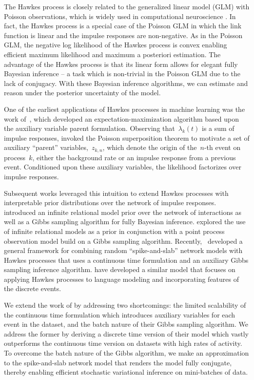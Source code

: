 The Hawkes process is closely related to the generalized linear model (GLM) with Poisson observations, which is widely used in computational neuroscience \cite{Paninski-2004, Pillow-2008}.  
In fact, the Hawkes process is a special case of the Poisson GLM in which the link function is linear and the impulse responses are non-negative. 
As in the Poisson GLM, the negative log likelihood of the Hawkes process is convex enabling efficient maximum likelihood and maximum a posteriori estimation. 
The advantage of the Hawkes process is that its linear form allows for elegant fully Bayesian inference -- a task which is non-trivial  in the Poisson GLM due to the lack of conjugacy. With these Bayesian inference algorithms, we can estimate and reason under the posterior uncertainty of the model.

One of the earliest applications of Hawkes processes in machine learning was the work of~\citet{Simma-2010}, which developed an expectation-maximization algorithm based upon the auxiliary variable parent formulation. Observing that~$\lambda_{k}(t)$ is a sum of impulse responses, \citet{Simma-2010} invoked the Poisson superposition theorem to motivate a set of auxiliary ``parent'' variables,~$z_{k,n}$, which denote the origin of the~$n$-th event on process~$k$, either the background rate or an impulse response from a previous event. Conditioned upon these auxiliary variables, the likelihood factorizes over impulse responses. 

Subsequent works leveraged this intuition to extend Hawkes processes with interpretable prior distributions over the network of impulse responses.
\citet{Blundell-2012} introduced an infinite relational model prior over the network of interactions as well as a Gibbs sampling algorithm for fully Bayesian inference.
\citet{Dubois-2013} explored the use of infinite relational models as a prior in conjunction with a point process observation model build on a Gibbs sampling algorithm.
Recently,~\citet{Linderman-2014} developed a general framework for combining random ``spike-and-slab'' network models with Hawkes processes that uses a continuous time formulation and an auxiliary Gibbs sampling inference algorithm.
\citet{Guo-2014} have developed a similar model that focuses on applying Hawkes processes to language modeling and incorporating features of the discrete events.

We extend the work of \citet{Linderman-2014} by addressing two shortcomings: the limited scalability of the continuous time formulation which introduces auxiliary variables for each event in the dataset, and the batch nature of their Gibbs sampling algorithm. We address the former by deriving a discrete time version of their model which vastly outperforms the continuous time version on datasets with high rates of activity. To overcome the batch nature of the Gibbs algorithm, we make an approximation to the spike-and-slab network model that renders the model fully conjugate, thereby enabling efficient stochastic variational inference \cite{Hoffman-2013} on mini-batches of data.

